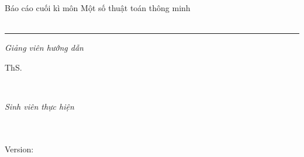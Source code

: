 %
\begin{titlepage}
	\flushright
	\hfill
	\vfill
	{\large Báo cáo cuối kì môn Một số thuật toán thông minh} \\[5mm]
	{\LARGE \color{ctcolortitle}\textbf{\thesisTitle} \\[10mm]}
	\rule[5pt]{\textwidth}{.4pt} \par
	\begin{minipage}[t]{.27\textwidth}
		\raggedleft
		\textit{Giảng viên hướng dẫn}
	\end{minipage}
	\hspace*{15pt}
	\begin{minipage}[t]{.65\textwidth}
		{\Large ThS.\teacher} \par
	\end{minipage} \\[5mm]
	\begin{minipage}[t]{.27\textwidth}
		\raggedleft
		\textit{Sinh viên thực hiện}
	\end{minipage}
	\hspace*{15pt}
	\begin{minipage}[t]{.65\textwidth}
		{\Large\thesisName}
	\end{minipage} \\[10mm]
	\vfill
	\vfill
	\textit{\large\thesisDate} \\
	Version: \thesisVersion
\end{titlepage}

